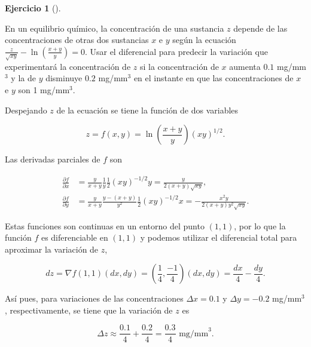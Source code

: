 \documentclass[
  a4paper,
]{scrreport}
\theoremstyle{definition}
\newtheorem{exercise}{Ejercicio}[chapter]
\theoremstyle{remark}
\begin{document}
\begin{exercise}[]\protect\hypertarget{exr-aproximacion-variabicon-concentraciones-equilibrio-quimico}{}\label{exr-aproximacion-variabicon-concentraciones-equilibrio-quimico}

En un equilibrio químico, la concentración de una sustancia \(z\)
depende de las concentraciones de otras dos sustancias \(x\) e \(y\)
según la ecuación
\(\frac{z}{\sqrt{xy}}-\ln\left(\frac{x+y}{y}\right) = 0\). Usar el
diferencial para predecir la variación que experimentará la
concentración de \(z\) si la concentración de \(x\) aumenta \(0.1\)
mg/mm\(^3\) y la de \(y\) disminuye \(0.2\) mg/mm\(^3\) en el instante
en que las concentraciones de \(x\) e \(y\) son 1 mg/mm\(^3\).

\end{exercise}

\begin{tcolorbox}[enhanced jigsaw, leftrule=.75mm, colbacktitle=quarto-callout-tip-color!10!white, toprule=.15mm, title=\textcolor{quarto-callout-tip-color}{\faLightbulb}\hspace{0.5em}{Solución}, bottomtitle=1mm, breakable, coltitle=black, colback=white, bottomrule=.15mm, colframe=quarto-callout-tip-color-frame, titlerule=0mm, toptitle=1mm, left=2mm, arc=.35mm, rightrule=.15mm, opacitybacktitle=0.6, opacityback=0]

Despejando \(z\) de la ecuación se tiene la función de dos variables

\[
z = f(x,y) = \ln\left(\frac{x+y}{y}\right)(xy)^{1/2}.
\]

Las derivadas parciales de \(f\) son

\begin{align*}
\frac{\partial f}{\partial x} 
&= \frac{y}{x+y}\frac{1}{y}\frac{1}{2}(xy)^{-1/2}y 
= \frac{y}{2(x+y)\sqrt{xy}}, \\
\frac{\partial f}{\partial y} 
&= \frac{y}{x+y}\frac{y-(x+y)}{y^2}\frac{1}{2}(xy)^{-1/2}x 
= -\frac{x^2y}{2(x+y)y^2\sqrt{xy}}.
\end{align*}

Estas funciones son continuas en un entorno del punto \((1,1)\), por lo
que la función \(f\) es diferenciable en \((1,1)\) y podemos utilizar el
diferencial total para aproximar la variación de \(z\),

\[
dz 
= \nabla f(1,1)(dx,dy)
= \left(\frac{1}{4}, \frac{-1}{4}\right)(dx, dy)
= \frac{dx}{4}-\frac{dy}{4}.
\]

Así pues, para variaciones de las concentraciones \(\Delta x=0.1\) y
\(\Delta y = -0.2\) mg/mm\(^3\), respectivamente, se tiene que la
variación de \(z\) es

\[
\Delta z \approx \frac{0.1}{4} + \frac{0.2}{4} 
= \frac{0.3}{4} \mbox{ mg/mm}^3.
\]

\end{tcolorbox}
\end{document}
